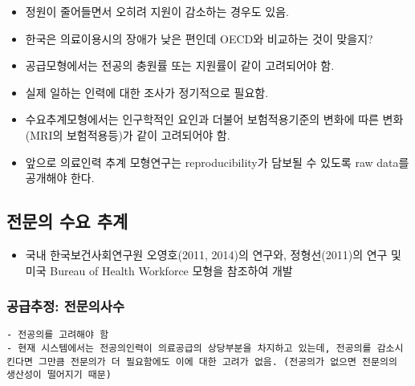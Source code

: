 \documentclass[]{book}
\providecommand{\tightlist}{%
  \setlength{\itemsep}{0pt}\setlength{\parskip}{0pt}}
\begin{document}
\begin{itemize}
  \begin{itemize}
  \item
    정원이 줄어들면서 오히려 지원이 감소하는 경우도 있음.
  \item
    한국은 의료이용시의 장애가 낮은 편인데 OECD와 비교하는 것이 맞을지?
  \item
    공급모형에서는 전공의 충원률 또는 지원률이 같이 고려되어야 함.
  \item
    실제 일하는 인력에 대한 조사가 정기적으로 필요함.
  \item
    수요추계모형에서는 인구학적인 요인과 더불어 보험적용기준의 변화에 따른 변화 (MRI의 보험적용등)가 같이 고려되어야 함.
  \item
    앞으로 의료인력 추계 모형연구는 reproducibility가 담보될 수 있도록 raw data를 공개해야 한다.
  \end{itemize}
\end{itemize}

\hypertarget{section-5}{%
\subsection{전문의 수요 추계}\label{section-5}}

\begin{itemize}
\tightlist
\item
  국내 한국보건사회연구원 오영호(2011, 2014)의 연구와, 정형선(2011)의 연구 및 미국 Bureau of Health Workforce 모형을 참조하여 개발
\end{itemize}

\hypertarget{section-6}{%
\subsubsection{공급추정: 전문의사수}\label{section-6}}

\begin{verbatim}
- 전공의를 고려해야 함
- 현재 시스템에서는 전공의인력이 의료공급의 상당부분을 차지하고 있는데, 전공의를 감소시킨다면 그만큼 전문의가 더 필요함에도 이에 대한 고려가 없음. (전공의가 없으면 전문의의 생산성이 떨어지기 때문)
\end{verbatim}
\end{document}
